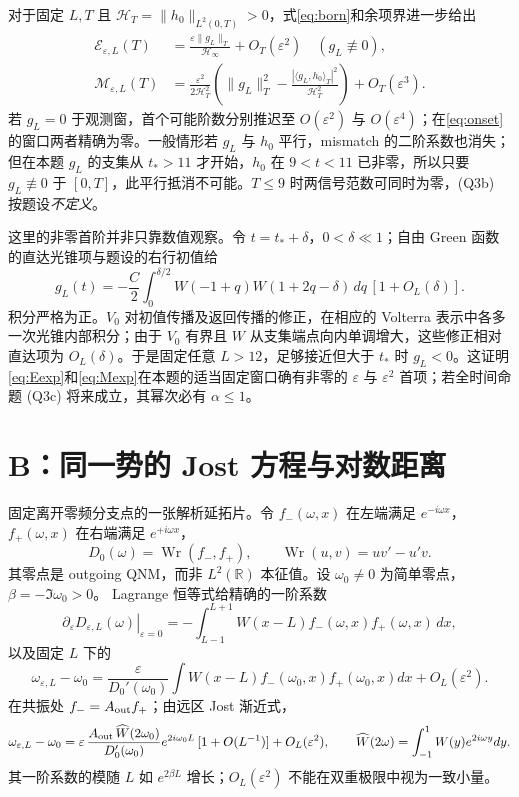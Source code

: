 \documentclass[UTF8,a4paper,11pt]{ctexart}
\DeclareMathOperator{\Wr}{Wr}
\newcommand{\ee}{\varepsilon}
\newcommand{\RR}{\mathbb R}
\newcommand{\HH}{\mathcal H}
\begin{document}
对于固定 $L,T$ 且 $\HH_T=\|h_0\|_{L^2(0,T)}>0$，式\eqref{eq:born}和余项界进一步给出
\begin{align}
 \mathcal E_{\ee,L}(T)
 &=\frac{\ee\|g_L\|_T}{\HH_\infty}+O_T(\ee^2)
 \quad (g_L\not\equiv0),\label{eq:Eexp}\\
 \mathcal M_{\ee,L}(T)
 &=\frac{\ee^2}{2\HH_T^2}
 \left(\|g_L\|_T^2-
 \frac{|\langle g_L,h_0\rangle_T|^2}{\HH_T^2}\right)
 +O_T(\ee^3).\label{eq:Mexp}
\end{align}
若 $g_L=0$ 于观测窗，首个可能阶数分别推迟至 $O(\ee^2)$ 与 $O(\ee^4)$；在\eqref{eq:onset}的窗口两者精确为零。一般情形若 $g_L$ 与 $h_0$ 平行，mismatch 的二阶系数也消失；但在本题 $g_L$ 的支集从 $t_*>11$ 才开始，$h_0$ 在 $9<t<11$ 已非零，所以只要 $g_L\not\equiv0$ 于 $[0,T]$，此平行抵消不可能。$T\leq9$ 时两信号范数可同时为零，(Q3b) 按题设\emph{不定义}。

这里的非零首阶并非只靠数值观察。令 $t=t_*+\delta$，$0<\delta\ll1$；自由 Green 函数的直达光锥项与题设的右行初值给
\begin{equation}\label{eq:front}
 g_L(t)=-\frac C2\int_0^{\delta/2}
 W(-1+q)W(1+2q-\delta)\,dq\,[1+O_L(\delta)].
\end{equation}
积分严格为正。$V_0$ 对初值传播及返回传播的修正，在相应的 Volterra 表示中各多一次光锥内部积分；由于 $V_0$ 有界且 $W$ 从支集端点向内单调增大，这些修正相对直达项为 $O_L(\delta)$。于是固定任意 $L>12$，足够接近但大于 $t_*$ 时 $g_L<0$。这证明\eqref{eq:Eexp}和\eqref{eq:Mexp}在本题的适当固定窗口确有非零的 $\ee$ 与 $\ee^2$ 首项；若全时间命题 (Q3c) 将来成立，其幂次必有 $\alpha\leq1$。

\section{B：同一势的 Jost 方程与对数距离}
固定离开零频分支点的一张解析延拓片。令 $f_-(\omega,x)$ 在左端满足 $e^{-i\omega x}$，$f_+(\omega,x)$ 在右端满足 $e^{+i\omega x}$，
\begin{equation}
 D_0(\omega)=\Wr(f_-,f_+),\qquad
 \Wr(u,v)=uv'-u'v.
\end{equation}
其零点是 outgoing QNM，而非 $L^2(\RR)$ 本征值。设 $\omega_0\neq0$ 为简单零点，$\beta=-\Im\omega_0>0$。
Lagrange 恒等式给精确的一阶系数
\begin{equation}\label{eq:wrvar}
 \left.\partial_\ee D_{\ee,L}(\omega)\right|_{\ee=0}
 =-\int_{L-1}^{L+1}W(x-L)f_-(\omega,x)f_+(\omega,x)\,dx,
\end{equation}
以及固定 $L$ 下的
\begin{equation}\label{eq:poleborn}
 \omega_{\ee,L}-\omega_0
 =\frac{\ee}{D_0'(\omega_0)}
 \int W(x-L)f_-(\omega_0,x)f_+(\omega_0,x)dx
 +O_L(\ee^2).
\end{equation}
在共振处 $f_-=A_{\rm out}f_+$；由远区 Jost 渐近式，
\begin{equation}\label{eq:shift}
 \omega_{\ee,L}-\omega_0
 =\ee\,\frac{A_{\rm out}\,\widehat W(2\omega_0)}{D_0'(\omega_0)}
 e^{2i\omega_0L}\,[1+O(L^{-1})]
 +O_L(\ee^2),\qquad
 \widehat W(2\omega)=\int_{-1}^1W(y)e^{2i\omega y}dy.
\end{equation}
其一阶系数的模随 $L$ 如 $e^{2\beta L}$ 增长；$O_L(\ee^2)$ 不能在双重极限中视为一致小量。
\end{document}
